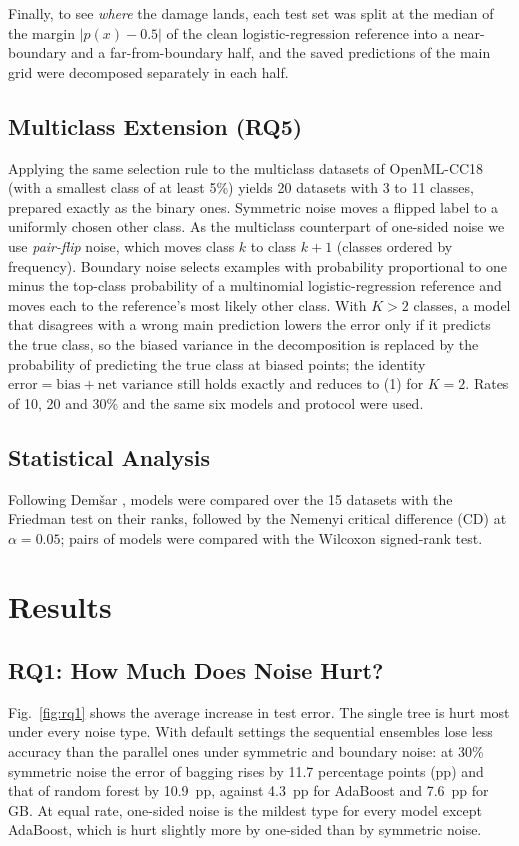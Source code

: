 \documentclass[conference,a4paper]{IEEEtran}
\begin{document}
Finally, to see \emph{where} the damage lands, each test set was split at the median of the margin $|p(x)-0.5|$ of the clean logistic-regression reference into a near-boundary and a far-from-boundary half, and the saved predictions of the main grid were decomposed separately in each half.

\subsection{Multiclass Extension (RQ5)}
Applying the same selection rule to the multiclass datasets of OpenML-CC18 (with a smallest class of at least 5\%) yields 20 datasets with 3 to 11 classes, prepared exactly as the binary ones. Symmetric noise moves a flipped label to a uniformly chosen other class. As the multiclass counterpart of one-sided noise we use \emph{pair-flip} noise, which moves class $k$ to class $k+1$ (classes ordered by frequency). Boundary noise selects examples with probability proportional to one minus the top-class probability of a multinomial logistic-regression reference and moves each to the reference's most likely other class. With $K>2$ classes, a model that disagrees with a wrong main prediction lowers the error only if it predicts the true class, so the biased variance in the decomposition is replaced by the probability of predicting the true class at biased points; the identity $\text{error}=\text{bias}+\text{net variance}$ still holds exactly and reduces to (1) for $K=2$. Rates of 10, 20 and 30\% and the same six models and protocol were used.

\subsection{Statistical Analysis}
Following Dem\v{s}ar \cite{demsar2006}, models were compared over the 15 datasets with the Friedman test on their ranks, followed by the Nemenyi critical difference (CD) at $\alpha=0.05$; pairs of models were compared with the Wilcoxon signed-rank test.

\section{Results}

\subsection{RQ1: How Much Does Noise Hurt?}
Fig.~\ref{fig:rq1} shows the average increase in test error. The single tree is hurt most under every noise type. With default settings the sequential ensembles lose less accuracy than the parallel ones under symmetric and boundary noise: at 30\% symmetric noise the error of bagging rises by 11.7 percentage points (pp) and that of random forest by 10.9~pp, against 4.3~pp for AdaBoost and 7.6~pp for GB. At equal rate, one-sided noise is the mildest type for every model except AdaBoost, which is hurt slightly more by one-sided than by symmetric noise.
\end{document}
